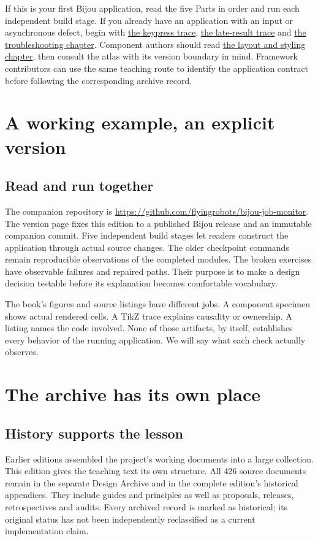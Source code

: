 If this is your first Bijou application, read the five Parts in order and run each independent build stage. If you already have an application with an input or asynchronous defect, begin with \hyperref[workshop-03]{the keypress trace}, \hyperref[workshop-04]{the late-result trace} and \hyperref[teaching-troubleshooting]{the troubleshooting chapter}. Component authors should read \hyperref[teaching-layout]{the layout and styling chapter}, then consult the atlas with its version boundary in mind. Framework contributors can use the same teaching route to identify the application contract before following the corresponding archive record.

\section*{A working example, an explicit version}
\subsection*{Read and run together}

The companion repository is \url{https://github.com/flyingrobots/bijou-job-monitor}. The version page fixes this edition to a published Bijou release and an immutable companion commit. Five independent build stages let readers construct the application through actual source changes. The older checkpoint commands remain reproducible observations of the completed modules. The broken exercises have observable failures and repaired paths. Their purpose is to make a design decision testable before its explanation becomes comfortable vocabulary.

The book's figures and source listings have different jobs. A component specimen shows actual rendered cells. A TikZ trace explains causality or ownership. A listing names the code involved. None of those artifacts, by itself, establishes every behavior of the running application. We will say what each check actually observes.

\section*{The archive has its own place}
\subsection*{History supports the lesson}

Earlier editions assembled the project's working documents into a large collection. This edition gives the teaching text its own structure. All 426 source documents remain in the separate Design Archive and in the complete edition's historical appendices. They include guides and principles as well as proposals, releases, retrospectives and audits. Every archived record is marked as historical; its original status has not been independently reclassified as a current implementation claim.

